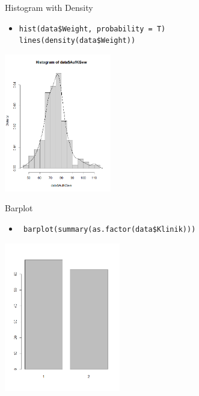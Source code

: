\documentclass[aspectratio = 169]{chariteBeamer}
\begin{document}
\begin{frame}[fragile]{Histogram with Density}
	\begin{itemize}
		\item \verb+hist(data$Weight, probability = T) + \\ \verb+lines(density(data$Weight))+
	\end{itemize}
			
	\begin{center}
		\includegraphics[height=6cm]{Density}
	\end{center}
\end{frame}

\begin{frame}[fragile]{Barplot}
	\begin{itemize}
		\item \verb+ barplot(summary(as.factor(data$Klinik)))+
	\end{itemize}
			
	\begin{center}
		\includegraphics[height=6.5cm]{Barplot}
	\end{center}
\end{frame}
\end{document}
